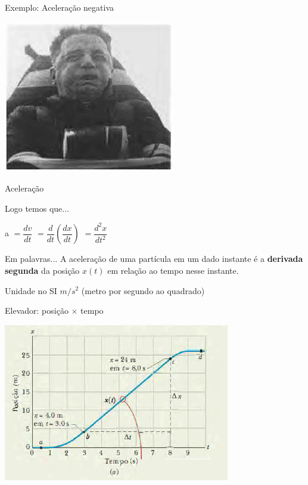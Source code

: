 \documentclass[xcolor=dvipsnames,table]{beamer}
\begin{document}
	\begin{frame}{Exemplo: Aceleração negativa}
		\begin{center}
			\includegraphics[scale=0.8]{images/fig2-7c}
		\end{center}
	\end{frame}

	\begin{frame}{Aceleração}
		\begin{block}{Logo temos que...}
			\begin{center}
				a $= \dfrac{d v}{d t}$ \pause 
				$ = \dfrac{d}{d t} \left( \dfrac{d x}{d t} \right)$ \pause
				$ = \dfrac{d^2x}{d t^2} $
			\end{center} 
		\end{block} \pause
		\begin{block}{Em palavras...}
			A aceleração de uma partícula em um dado instante é a {\bf derivada segunda} da posição $x(t)$ em relação ao tempo nesse instante.
		\end{block} \pause
		\begin{block}{Unidade no SI}
			$m/s^2$ (metro por segundo ao quadrado)
		\end{block}
	\end{frame}

	\begin{frame}{Elevador: posição $\times$ tempo}
		\begin{center}
			\includegraphics[scale=0.7]{images/fig2-6a}
		\end{center}
	\end{frame}
	
\end{document}
